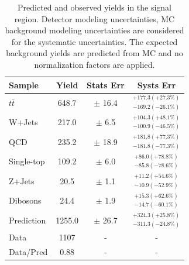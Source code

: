 \renewcommand{\arraystretch}{1.5}
\begin{table}
\begin{center}
\begin{tabular}{l|c|c|c}
Sample        &    Yield &  Stats Err &   Systs Err \\
\hline
$t\bar{t}$    &  648.7   & $\pm$ 16.4    & $^{+177.3(+27.3\%)}_{-169.2(-26.1\%)}$ \\
W+Jets        &  217.0   & $\pm$ 6.5     & $^{+104.3(+48.1\%)}_{-100.9(-46.5\%)}$ \\
QCD           &  235.2   & $\pm$ 18.9    & $^{+181.8(+77.3\%)}_{-181.8(-77.3\%)}$ \\
Single-top    &  109.2   & $\pm$ 6.0     & $^{+86.0(+78.8\%)}_{-85.8(-78.6\%)}$ \\
Z+Jets        &  20.5    & $\pm$ 1.1     & $^{+11.2(+54.6\%)}_{-10.9(-52.9\%)}$ \\
Dibosons      &  24.4    & $\pm$ 1.9     & $^{+15.3(+62.6\%)}_{-14.7(-60.1\%)}$ \\
\hline
Prediction    &  1255.0  & $\pm$ 26.7    & $^{+324.3(+25.8\%)}_{-311.3(-24.8\%)}$ \\
Data          &  1107    & - & - \\
\hline
Data/Pred     &  0.88    & - & - \\
\hline
\end{tabular}
\end{center}
\caption[Predicted and observed yields in the signal region]{Predicted and observed yields in the signal region. Detector modeling
uncertainties, MC background modeling uncertainties are considered for the systematic uncertainties.
The expected background yields are predicted from MC and no normalization factors are applied.}
\label{tab:boosted_results_sr_yields}
\end{table}
\renewcommand{\arraystretch}{1.0}
\FloatBarrier

